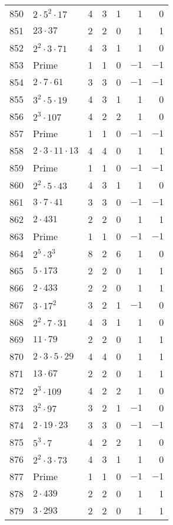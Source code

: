 \documentclass[12pt]{article}
\begin{document}
\begin{tabular}{|r|l|r|r|r|r|r|}
850 & $2 \cdot 5^2 \cdot 17$ & 4 & 3 & 1 & 1 & 0 \\
851 & $23 \cdot 37$ & 2 & 2 & 0 & 1 & 1 \\
852 & $2^2 \cdot 3 \cdot 71$ & 4 & 3 & 1 & 1 & 0 \\
853 & Prime & 1 & 1 & 0 & $-1$ & $-1$ \\
854 & $2 \cdot 7 \cdot 61$ & 3 & 3 & 0 & $-1$ & $-1$ \\
855 & $3^2 \cdot 5 \cdot 19$ & 4 & 3 & 1 & 1 & 0 \\
856 & $2^3 \cdot 107$ & 4 & 2 & 2 & 1 & 0 \\
857 & Prime & 1 & 1 & 0 & $-1$ & $-1$ \\
858 & $2 \cdot 3 \cdot 11 \cdot 13$ & 4 & 4 & 0 & 1 & 1 \\
859 & Prime & 1 & 1 & 0 & $-1$ & $-1$ \\
860 & $2^2 \cdot 5 \cdot 43$ & 4 & 3 & 1 & 1 & 0 \\
861 & $3 \cdot 7 \cdot 41$ & 3 & 3 & 0 & $-1$ & $-1$ \\
862 & $2 \cdot 431$ & 2 & 2 & 0 & 1 & 1 \\
863 & Prime & 1 & 1 & 0 & $-1$ & $-1$ \\
864 & $2^5 \cdot 3^3$ & 8 & 2 & 6 & 1 & 0 \\
865 & $5 \cdot 173$ & 2 & 2 & 0 & 1 & 1 \\
866 & $2 \cdot 433$ & 2 & 2 & 0 & 1 & 1 \\
867 & $3 \cdot 17^2$ & 3 & 2 & 1 & $-1$ & 0 \\
868 & $2^2 \cdot 7 \cdot 31$ & 4 & 3 & 1 & 1 & 0 \\
869 & $11 \cdot 79$ & 2 & 2 & 0 & 1 & 1 \\
870 & $2 \cdot 3 \cdot 5 \cdot 29$ & 4 & 4 & 0 & 1 & 1 \\
871 & $13 \cdot 67$ & 2 & 2 & 0 & 1 & 1 \\
872 & $2^3 \cdot 109$ & 4 & 2 & 2 & 1 & 0 \\
873 & $3^2 \cdot 97$ & 3 & 2 & 1 & $-1$ & 0 \\
874 & $2 \cdot 19 \cdot 23$ & 3 & 3 & 0 & $-1$ & $-1$ \\
875 & $5^3 \cdot 7$ & 4 & 2 & 2 & 1 & 0 \\
876 & $2^2 \cdot 3 \cdot 73$ & 4 & 3 & 1 & 1 & 0 \\
877 & Prime & 1 & 1 & 0 & $-1$ & $-1$ \\
878 & $2 \cdot 439$ & 2 & 2 & 0 & 1 & 1 \\
879 & $3 \cdot 293$ & 2 & 2 & 0 & 1 & 1 \\

\end{tabular}
\end{document}
